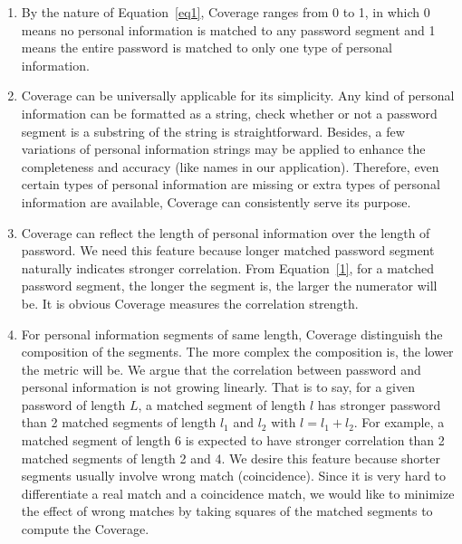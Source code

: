 \documentclass{sig-alternate}
\begin{document}
\begin{enumerate}[leftmargin=*]
\item By the nature of Equation~\ref{eq1}, Coverage ranges from 0 to 1, in which 0 means no personal information is matched to any password segment and 1 means the entire password is matched to only one type of personal information. 
\item Coverage can be universally applicable for its simplicity. Any kind of personal information can be formatted as a string, check whether or not a password segment is a substring of the string is straightforward. Besides, a few variations of personal information strings may be applied to enhance the completeness and accuracy (like names in our application). Therefore, even certain types of personal information are missing or extra types of personal information are available, Coverage can consistently serve its purpose.
\item Coverage can reflect the length of personal information over the length of password. We need this feature because longer matched password segment naturally indicates stronger correlation. From Equation~\ref{1}, for a matched password segment, the longer the segment is, the larger the numerator will be. It is obvious Coverage measures the correlation strength. \item For personal information segments of same length, Coverage distinguish the composition of the segments. The more complex the composition is, the lower the metric will be. We argue that the correlation between password and personal information is not growing linearly. That is to say, for a given password of length $L$, a matched segment of length $l$ has stronger password than 2 matched segments of length $l_1$ and $l_2$ with $l = l_1 + l_2$. For example, a matched segment of length 6 is expected to have stronger correlation than 2 matched segments of length 2 and 4. We desire this feature because shorter segments usually involve wrong match (coincidence). Since it is very hard to differentiate a real match and a coincidence match, we would like to minimize the effect of wrong matches by taking squares of the matched segments to compute the Coverage.
\end{enumerate}
\end{document}
